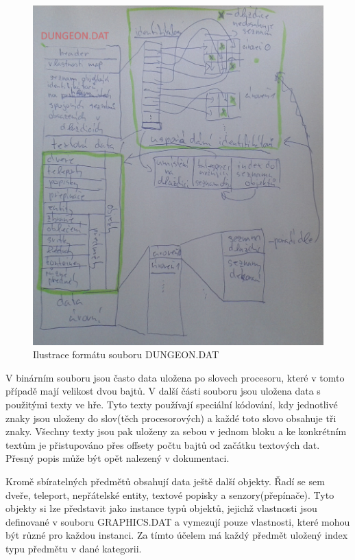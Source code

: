 \begin{figure}[p]\centering
\includegraphics[width=\textwidth]{./img/DM-dungeon-dat.png}
\caption{Ilustrace formátu souboru DUNGEON.DAT}
\label{DM-dungeon-dat:analyza}
\end{figure}

V binárním souboru jsou často data uložena po slovech procesoru, které v tomto případě mají velikost dvou bajtů. 
V další části souboru jsou uložena data s použitými texty ve hře. Tyto texty používají speciální kódování,
kdy jednotlivé znaky jsou uloženy do slov(těch procesorových) a každé toto slovo obsahuje tři znaky. Všechny 
texty jsou pak uloženy za sebou v jednom bloku a ke konkrétním textům je přistupováno přes offsety počtu bajtů
od začátku textových dat. Přesný popis může být opět nalezený v dokumentaci\cite{TechnicalDocumentationFontanel05}.

Kromě sbíratelných předmětů obsahují data ještě další objekty. Řadí se sem dveře, 
teleport, nepřátelské entity, textové popisky a senzory(přepínače). Tyto objekty si lze představit jako instance typů objektů, 
jejichž vlastnosti jsou definované v souboru GRAPHICS.DAT a vymezují pouze vlastnosti, které mohou být různé pro každou instanci.
Za tímto účelem má každý předmět uložený index typu předmětu v dané kategorii.  

